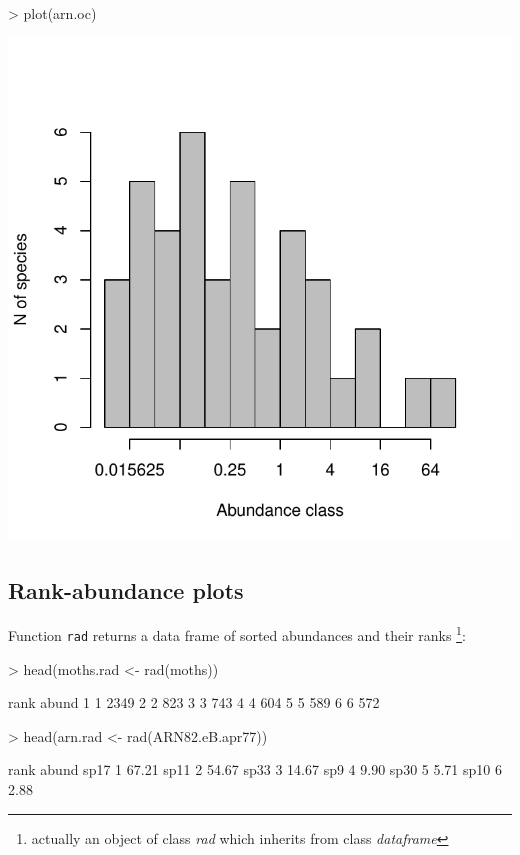 \documentclass[11pt, A4]{article}
\newcommand{\code}[1]{\texttt{#1}}
\begin{document}
\begin{Schunk}
\begin{Sinput}
> plot(arn.oc)
\end{Sinput}
\end{Schunk}
\includegraphics{sads_quick_reference-Biomass-octave-plot}



\subsection{Rank-abundance plots}
\label{sec:rank_abund}
Function \code{rad} returns a data frame of sorted abundances and their ranks 
\footnote{actually an object of class \emph{rad} which inherits from class \emph{dataframe}}:

\begin{Schunk}
\begin{Sinput}
> head(moths.rad <- rad(moths))
\end{Sinput}
\begin{Soutput}
  rank abund
1    1  2349
2    2   823
3    3   743
4    4   604
5    5   589
6    6   572
\end{Soutput}
\begin{Sinput}
> head(arn.rad <- rad(ARN82.eB.apr77))
\end{Sinput}
\begin{Soutput}
     rank abund
sp17    1 67.21
sp11    2 54.67
sp33    3 14.67
sp9     4  9.90
sp30    5  5.71
sp10    6  2.88
\end{Soutput}
\end{Schunk}
\end{document}
